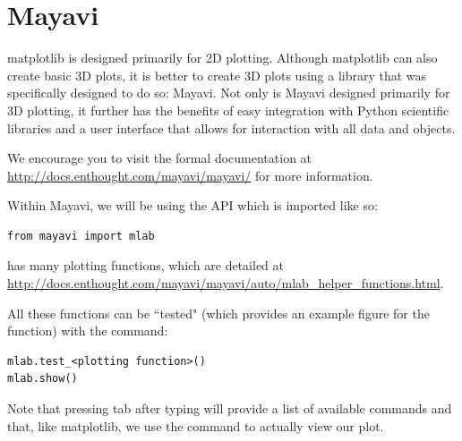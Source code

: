 \section*{Mayavi}

matplotlib is designed primarily for 2D plotting.
Although matplotlib can also create basic 3D plots, it is better to create 3D plots using a library that was specifically designed to do so: Mayavi.
Not only is Mayavi designed primarily for 3D plotting, it further has the benefits of easy integration with Python scientific libraries and a user interface that allows for interaction with all data and objects.

We encourage you to visit the formal documentation at \url{http://docs.enthought.com/mayavi/mayavi/} for more information.

Within Mayavi, we will be using the  API which is imported like so:
\begin{lstlisting}
from mayavi import mlab
\end{lstlisting}

 has many plotting functions, which are detailed at \url{http://docs.enthought.com/mayavi/mayavi/auto/mlab_helper_functions.html}.

All these functions can be ``tested" (which provides an example figure for the function) with the command:
\begin{lstlisting}
mlab.test_<plotting function>()
mlab.show()
\end{lstlisting}
Note that pressing tab after typing  will provide a list of available commands and that, like matplotlib, we use the  command to actually view our plot.

